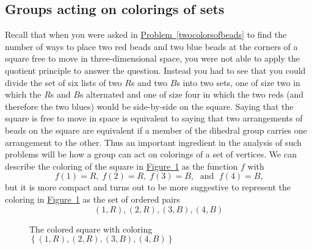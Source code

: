 \documentclass[10pt,]{book}
\theoremstyle{plain}
\theoremstyle{definition}
\theoremstyle{definition}
\numberwithin{equation}{chapter}
\begin{document}
\typeout{************************************************}
\typeout{************************************************}
\subsection[{Groups acting on colorings of sets}]{Groups acting on colorings of sets}\label{subsection-65}
\hypertarget{p-1612}{}%
Recall that when you were asked in \hyperref[twocolorsofbeads]{Problem~\ref{twocolorsofbeads}} to find the number of ways to place two red beads and two blue beads at the corners of a square free to move in three-dimensional space, you were not able to apply the quotient principle to answer the question. Instead you had to see that you could divide the set of six lists of two \(R\)s and two \(B\)s into two sets, one of size two in which the \(R\)s and \(B\)s alternated and one of size four in which the two reds (and therefore the two blues) would be side-by-side on the square. Saying that the square is free to move in space is equivalent to saying that two arrangements of beads on the square are equivalent if a member of the dihedral group carries one arrangement to the other. Thus an important ingredient in the analysis of such problems will be how a group can act on colorings of a set of vertices. We can describe the coloring of the square in \hyperref[colored-square]{Figure~\ref{colored-square}} as the function \(f\) with%
\begin{equation*}
f(1)=R,\; f(2)=R, \; f(3)=B,\;\text{ and }\;f(4)=B\text{,}
\end{equation*}
but it is more compact and turns out to be more suggestive to represent the coloring in \hyperref[colored-square]{Figure~\ref{colored-square}} as the set of ordered pairs%
\begin{equation}
(1,R), (2,R), (3,B), (4,B)\label{coloring-pairs}
\end{equation}
%
\begin{figure}
\centering
{
}
\caption{The colored square with coloring \(\left\{(1,R),(2,R),(3,B),(4,B)\right\}\)\label{colored-square}}
\end{figure}
\end{document}
